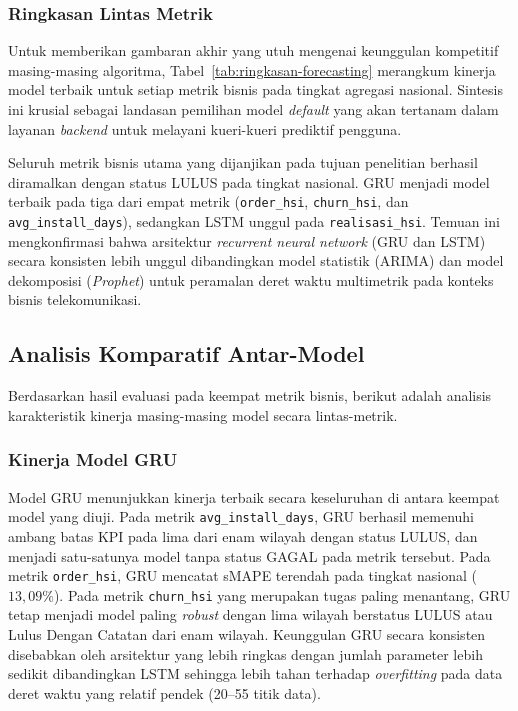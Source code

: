 \subsubsection{Ringkasan Lintas Metrik}

Untuk memberikan gambaran akhir yang utuh mengenai keunggulan kompetitif masing-masing algoritma, Tabel~\ref{tab:ringkasan-forecasting} merangkum kinerja model terbaik untuk setiap metrik bisnis pada tingkat agregasi nasional. Sintesis ini krusial sebagai landasan pemilihan model \textit{default} yang akan tertanam dalam layanan \textit{backend} untuk melayani kueri-kueri prediktif pengguna.



Seluruh metrik bisnis utama yang dijanjikan pada tujuan penelitian berhasil diramalkan dengan status LULUS pada tingkat nasional. GRU menjadi model terbaik pada tiga dari empat metrik (\texttt{order\_}\allowbreak\texttt{hsi}, \texttt{churn\_}\allowbreak\texttt{hsi}, dan \texttt{avg\_}\allowbreak\texttt{install\_}\allowbreak\texttt{days}), sedangkan LSTM unggul pada \texttt{realisasi\_}\allowbreak\texttt{hsi}. Temuan ini mengkonfirmasi bahwa arsitektur \textit{recurrent neural network} (GRU dan LSTM) secara konsisten lebih unggul dibandingkan model statistik (ARIMA) dan model dekomposisi (\textit{Prophet}) untuk peramalan deret waktu multimetrik pada konteks bisnis telekomunikasi.

\subsection{Analisis Komparatif Antar-Model}

Berdasarkan hasil evaluasi pada keempat metrik bisnis, berikut adalah analisis karakteristik kinerja masing-masing model secara lintas-metrik.

\subsubsection{Kinerja Model GRU}

Model GRU menunjukkan kinerja terbaik secara keseluruhan di antara keempat model yang diuji. Pada metrik \texttt{avg\_}\allowbreak\texttt{install\_}\allowbreak\texttt{days}, GRU berhasil memenuhi ambang batas KPI pada lima dari enam wilayah dengan status LULUS, dan menjadi satu-satunya model tanpa status GAGAL pada metrik tersebut. Pada metrik \texttt{order\_}\allowbreak\texttt{hsi}, GRU mencatat sMAPE terendah pada tingkat nasional ($13{,}09\%$). Pada metrik \texttt{churn\-\_hsi} yang me\-ru\-pa\-kan tugas paling menantang, GRU tetap menjadi model paling \textit{robust} dengan lima wilayah berstatus LULUS atau Lulus Dengan Catatan dari enam wilayah. Keunggulan GRU secara konsisten disebabkan oleh arsitektur yang lebih ringkas dengan jumlah parameter lebih sedikit dibandingkan LSTM sehingga lebih tahan terhadap \textit{overfitting} pada data deret waktu yang relatif pendek (20--55 titik data).

